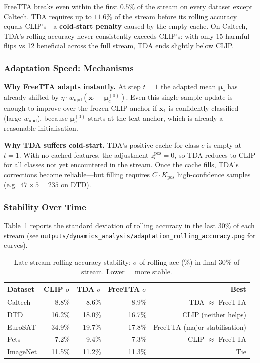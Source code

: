\documentclass[12pt,a4paper]{article}
\newcommand{\bx}{\mathbf{x}}
\newcommand{\bmu}{\boldsymbol{\mu}}
\newcommand{\1}{\mathbf{1}}
\begin{document}
FreeTTA breaks even within the first $0.5\%$ of the stream on every dataset except Caltech.
TDA requires up to $11.6\%$ of the stream before its rolling accuracy equals CLIP's---a \textbf{cold-start penalty} caused by the empty cache.
On Caltech, TDA's rolling accuracy never consistently exceeds CLIP's: with only 15 harmful flips vs 12 beneficial across the full stream, TDA ends slightly below CLIP.

\subsubsection{Adaptation Speed: Mechanisms}

\textbf{Why FreeTTA adapts instantly.}
At step $t=1$ the adapted mean $\bmu_c$ has already shifted by
$\eta \cdot w_\text{upd}(\bx_1 - \bmu_c^{(0)})$.
Even this single-sample update is enough to improve over the frozen CLIP anchor if
$\bx_1$ is confidently classified (large $w_\text{upd}$), because $\bmu_c^{(0)}$ starts
at the text anchor, which is already a reasonable initialisation.

\textbf{Why TDA suffers cold-start.}
TDA's positive cache for class $c$ is empty at $t=1$.
With no cached features, the adjustment $z^\text{pos}_c = 0$, so TDA reduces to CLIP for all
classes not yet encountered in the stream.
Once the cache fills, TDA's corrections become reliable---but filling requires $C \cdot K_\text{pos}$ high-confidence samples (e.g.\ $47 \times 5 = 235$ on DTD).

\subsubsection{Stability Over Time}

Table~\ref{tab:stability} reports the standard deviation of rolling accuracy in the last 30\% of
each stream (see \texttt{outputs/dynamics\_analysis/adaptation\_rolling\_accuracy.png} for curves).

\begin{table}[H]
\centering
\caption{Late-stream rolling-accuracy stability: $\sigma$ of rolling acc (\%) in final 30\% of stream.
Lower = more stable.}
\label{tab:stability}
\begin{tabular}{@{}lrrrr@{}}
\toprule
Dataset & CLIP $\sigma$ & TDA $\sigma$ & FreeTTA $\sigma$ & Best \\
\midrule
Caltech  & 8.8\%  & 8.6\%  & 8.9\%  & TDA $\approx$ FreeTTA \\
DTD      & 16.2\% & 18.0\% & 16.7\% & CLIP (neither helps) \\
EuroSAT  & 34.9\% & 19.7\% & 17.8\% & FreeTTA (major stabilisation) \\
Pets     & 7.2\%  & 9.4\%  & 7.3\%  & CLIP $\approx$ FreeTTA \\
ImageNet & 11.5\% & 11.2\% & 11.3\% & Tie \\
\bottomrule
\end{tabular}
\end{table}
\end{document}
